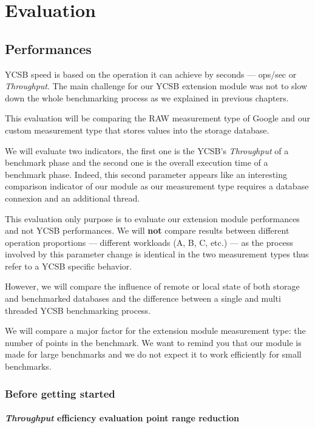 \documentclass[a4paper,11pt]{report}
\begin{document}
\chapter{Evaluation}

\section{Performances}

YCSB speed is based on the operation it can achieve by seconds --- ops/sec or \textit{Throughput}. The main challenge for our YCSB extension module was not to slow down the whole benchmarking process as we explained in previous chapters.

This evaluation will be comparing the RAW measurement type of Google and our custom measurement type that stores values into the storage database.

We will evaluate two indicators, the first one is the YCSB's \textit{Throughput} of a benchmark phase and the second one is the overall execution time of a benchmark phase. Indeed, this second parameter appears like an interesting comparison indicator of our module as our measurement type requires a database connexion and an additional thread.

\bigskip

This evaluation only purpose is to evaluate our extension module performances and not YCSB performances. We will \textbf{not} compare results between different operation proportions --- different workloads (A, B, C, etc.) --- as the process involved by this parameter change is identical in the two measurement types thus refer to a YCSB specific behavior.

However, we will compare the influence of remote or local state of both storage and benchmarked databases and the difference between a single and multi threaded YCSB benchmarking process. 

We will compare a major factor for the extension module measurement type: the number of points in the benchmark. We want to remind you that our module is made for large benchmarks and we do not expect it to work efficiently for small benchmarks.

\subsection{Before getting started}

\subsubsection{\textit{Throughput} efficiency evaluation point range reduction}
\end{document}
